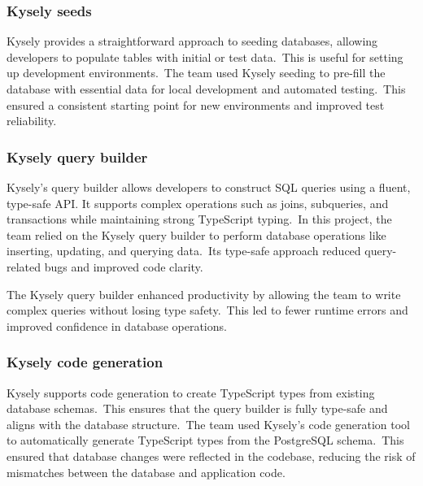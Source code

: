 

\subsubsection{Kysely seeds}\label{subsubsec:kysely-seeds}

Kysely provides a straightforward approach to seeding databases, allowing developers to populate tables with initial or test data.\ This is useful for setting up development environments.\ The team used Kysely seeding to pre-fill the database with essential data for local development and automated testing.\ This ensured a consistent starting point for new environments and improved test reliability.



\subsubsection{Kysely query builder}\label{subsubsec:kysely-query-builder}

Kysely's query builder allows developers to construct SQL queries using a fluent, type-safe API. It supports complex operations such as joins, subqueries, and transactions while maintaining strong TypeScript typing.\ In this project, the team relied on the Kysely query builder to perform database operations like inserting, updating, and querying data.\ Its type-safe approach reduced query-related bugs and improved code clarity.

The Kysely query builder enhanced productivity by allowing the team to write complex queries without losing type safety.\ This led to fewer runtime errors and improved confidence in database operations.



\subsubsection{Kysely code generation}\label{subsubsec:kysely-code-generation}

Kysely supports code generation to create TypeScript types from existing database schemas.\ This ensures that the query builder is fully type-safe and aligns with the database structure.\ The team used Kysely's code generation tool to automatically generate TypeScript types from the PostgreSQL schema.\ This ensured that database changes were reflected in the codebase, reducing the risk of mismatches between the database and application code.


